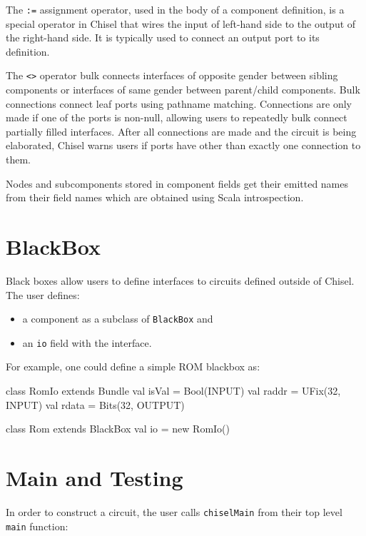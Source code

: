 \documentclass[10pt,twocolumn]{article}
\def\code#1{{\small\tt #1}}
\begin{document}
\noindent
The \code{:=} assignment operator, used in the body of a
component definition, is a special operator in Chisel that wires the input of
left-hand side to the output of the right-hand side.  It is typically
used to connect an output port to its definition.

The \code{<>} operator bulk connects interfaces of opposite gender between
sibling components or interfaces of same gender between parent/child components. 
Bulk connections connect leaf ports using pathname matching.
Connections are only made if one of the ports is non-null,
allowing users to repeatedly bulk connect partially filled interfaces.
After all connections are made and the circuit is being elaborated,
Chisel warns users if ports have other than exactly one connection to them.

Nodes and subcomponents stored in component fields get their emitted
names from their field names which are obtained using Scala introspection.


\section{BlackBox}

Black boxes allow users to define interfaces to circuits defined
outside of Chisel.  The user defines:

\begin{itemize}
\item a component as a subclass of \code{BlackBox} and
\item an \code{io} field with the interface.
\end{itemize}

\noindent
For example, one could define a simple ROM blackbox as:

\begin{scala}
class RomIo extends Bundle {
  val isVal = Bool(INPUT)
  val raddr = UFix(32, INPUT)
  val rdata = Bits(32, OUTPUT)
}

class Rom extends BlackBox {
  val io = new RomIo()
}
\end{scala}

\section{Main and Testing}

In order to construct a circuit, 
the user calls \code{chiselMain} from their top level \code{main} function:
\end{document}
